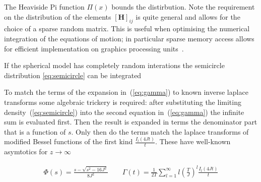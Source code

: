 \documentclass{article}[12pt]
\numberwithin{equation}{section}
\begin{document}
The Heaviside Pi function $\Pi(x)$ bounds the distirbution. Note
the requirement on the distribution of the elements $[\mathbf{H}]_{ij}$
is quite general and allows for the choice of a sparse random matrix. This is
useful when optimising the numerical integration of the equations of motion; in
particular sparse memory access allows for efficient implementation on graphics
processing units~\cite{}.

If the spherical model has completely random interations the semicircle
distribution \eqref{eq:semicircle} can be integrated

To match the terms of the expansion in~(\ref{eq:gamma}) to known inverse laplace
transforms some algebraic trickery is required: after substituting the limiting
density~(\ref{eq:semicircle}) into the second equation in~(\ref{eq:gamma}) the
infinite sum is evaluated first. Then the result is expanded in terms the denominator
part that is a function of $s$. Only then do the terms match the laplace transforms
of modified Bessel functions of the first kind $\frac{I_{l}(4Jt)}{t}$.
These have well-known asymtotics for $z\rightarrow\infty$

\begin{align}
  \Phi(s)=\frac{s-\sqrt{s^2-16J^2}}{8J^2}\qquad
  \Gamma(t)=\frac{1}{2T}
  \sum_{l=1}^{\infty}l\left(\frac{T}{J}\right)^{l}\frac{I_{l}(4Jt)}{t}
\end{align}
\pagebreak
\end{document}
